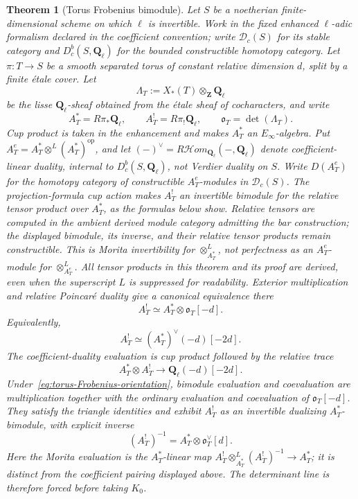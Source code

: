 \documentclass[11pt]{article}
\newtheorem{theorem}{Theorem}[section]
\theoremstyle{definition}
\theoremstyle{remark}
\newcommand{\Qell}{\mathbf Q_\ell}
\begin{document}
\begin{theorem}[Torus Frobenius bimodule]
\label{thm:torus-Frobenius-bimodule}
Let $S$ be a noetherian finite-dimensional scheme on which $\ell$ is
invertible.  Work in the fixed enhanced $\ell$-adic formalism declared in the
coefficient convention; write $\mathscr D_c(S)$ for its stable category and
$D_c^b(S,\Qell)$ for the bounded constructible homotopy category.  Let
$\pi:T\to S$ be a
smooth separated torus of constant relative dimension $d$, split by a finite
\'etale cover.  Let
\[
 \Lambda_T:=X_*(T)\otimes_{\mathbf Z}\Qell
\]
be the lisse $\Qell$-sheaf obtained from the \'etale sheaf of cocharacters,
and write
\[
 A_T^*=R\pi_*\Qell,
 \qquad
 A_T^!=R\pi_!\Qell,
 \qquad
 \mathfrak o_T=\det(\Lambda_T).
\]
Cup product is taken in the enhancement and makes $A_T^*$ an
$E_\infty$-algebra.  Put
$A_T^e=A_T^*\otimes^L(A_T^*)^{\mathrm{op}}$, and let
$(-)^\vee=R\mathcal Hom_{\Qell}(-,\Qell)$ denote coefficient-linear duality,
internal to $D_c^b(S,\Qell)$, not Verdier duality on $S$.  Write
$D(A_T^e)$ for the homotopy category of constructible $A_T^e$-modules in
$\mathscr D_c(S)$.  The projection-formula cup action makes $A_T^!$ an
invertible bimodule for the relative tensor product over $A_T^*$, as the
formulas below show.  Relative tensors are computed in the ambient derived
module category admitting the bar construction; the displayed bimodule,
its inverse, and their relative tensor products remain constructible.
This is Morita invertibility for $\otimes^L_{A_T^*}$, not perfectness as
an $A_T^e$-module for $\otimes^L_{A_T^e}$.  All tensor products in this
theorem and its proof are derived, even when the superscript $L$ is
suppressed for readability.  Exterior multiplication
and relative Poincar\'e duality give a canonical equivalence there
\begin{equation}
 \boxed{
 A_T^!\simeq A_T^*\otimes\mathfrak o_T[-d].}
 \label{eq:torus-Frobenius-orientation}
\end{equation}
Equivalently,
\begin{equation}
 A_T^!\simeq (A_T^*)^\vee(-d)[-2d].
 \label{eq:torus-compact-ordinary-dual}
\end{equation}
The coefficient-duality evaluation is cup product followed by the relative
trace
\[
 A_T^*\otimes A_T^!\longrightarrow\Qell(-d)[-2d].
\]
Under~\eqref{eq:torus-Frobenius-orientation}, bimodule evaluation and
coevaluation are multiplication together with the ordinary evaluation and
coevaluation of $\mathfrak o_T[-d]$.  They satisfy the triangle identities and
exhibit $A_T^!$ as an invertible dualizing $A_T^*$-bimodule, with explicit
inverse
\begin{equation}
 (A_T^!)^{-1}=A_T^*\otimes\mathfrak o_T^\vee[d].
 \label{eq:torus-Frobenius-inverse}
\end{equation}
Here the Morita evaluation is the $A_T^*$-linear map
$A_T^!\otimes^L_{A_T^*}(A_T^!)^{-1}\to A_T^*$; it is distinct from the
coefficient pairing displayed above.  The determinant line is therefore
forced before taking $K_0$.


\end{theorem}
\end{document}
